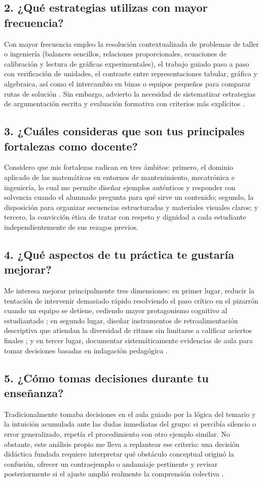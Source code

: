 \documentclass[spanish,letterpaper,oneside]{article}
\begin{document}
\subsection*{2. ¿Qué estrategias utilizas con mayor frecuencia?}
Con mayor frecuencia empleo la resolución contextualizada de problemas de taller o ingeniería (balances sencillos, relaciones proporcionales, ecuaciones de calibración y lectura de gráficas experimentales), el trabajo guiado paso a paso con verificación de unidades, el contraste entre representaciones tabular, gráfica y algebraica, así como el intercambio en binas o equipos pequeños para comparar rutas de solución \citep{star2015algebra}. Sin embargo, advierto la necesidad de sistematizar estrategias de argumentación escrita y evaluación formativa con criterios más explícitos \citep{eef2021feedback}.

\subsection*{3. ¿Cuáles consideras que son tus principales fortalezas como docente?}
Considero que mis fortalezas radican en tres ámbitos: primero, el dominio aplicado de las matemáticas en entornos de mantenimiento, mecatrónica e ingeniería, lo cual me permite diseñar ejemplos auténticos y responder con solvencia cuando el alumnado pregunta para qué sirve un contenido; segundo, la disposición para organizar secuencias estructuradas y materiales visuales claros; y tercero, la convicción ética de tratar con respeto y dignidad a cada estudiante independientemente de sus rezagos previos.

\subsection*{4. ¿Qué aspectos de tu práctica te gustaría mejorar?}
Me interesa mejorar principalmente tres dimensiones: en primer lugar, reducir la tentación de intervenir demasiado rápido resolviendo el paso crítico en el pizarrón cuando un equipo se detiene, cediendo mayor protagonismo cognitivo al estudiantado \citep{sawyer2008optimizing}; en segundo lugar, diseñar instrumentos de retroalimentación descriptiva que atiendan la diversidad de ritmos sin limitarse a calificar aciertos finales \citep{bostrom2023formative}; y en tercer lugar, documentar sistemáticamente evidencias de aula para tomar decisiones basadas en indagación pedagógica \citep{restrepo2004investigacion}.

\subsection*{5. ¿Cómo tomas decisiones durante tu enseñanza?}
Tradicionalmente tomaba decisiones en el aula guiado por la lógica del temario y la intuición acumulada ante las dudas inmediatas del grupo: si percibía silencio o error generalizado, repetía el procedimiento con otro ejemplo similar. No obstante, este análisis propio me lleva a replantear ese criterio: una decisión didáctica fundada requiere interpretar qué obstáculo conceptual originó la confusión, ofrecer un contraejemplo o andamiaje pertinente y revisar posteriormente si el ajuste amplió realmente la comprensión colectiva \citep{eef2017mathematics}.
\end{document}
